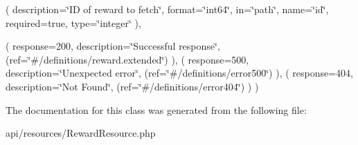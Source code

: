 ( description=\char`\"{}\+I\+D of reward to fetch\char`\"{}, format=\char`\"{}int64\char`\"{}, in=\char`\"{}path\char`\"{}, name=\char`\"{}id\char`\"{}, required=true, type=\char`\"{}integer\char`\"{} ),

( response=200, description=\char`\"{}\+Successful response\char`\"{}, (ref=\char`\"{}\#/definitions/reward.\+extended\char`\"{}) ), ( response=500, description=\char`\"{}\+Unexpected error\char`\"{}, (ref=\char`\"{}\#/definitions/error500\char`\"{}) ), ( response=404, description=\char`\"{}\+Not Found\char`\"{}, (ref=\char`\"{}\#/definitions/error404\char`\"{}) ) ) 


The documentation for this class was generated from the following file\+:\begin{DoxyCompactItemize}
\item 
api/resources/Reward\+Resource.\+php\end{DoxyCompactItemize}
